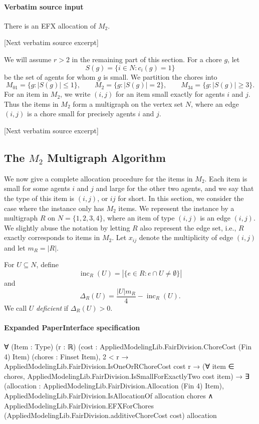 \documentclass[10pt]{article}
\begin{document}
\paragraph{Verbatim source input}
\begin{ReviewVerbatim}
\begin{lemma}\label{lem:M2}
There is an EFX allocation of $M_2$.
\end{lemma}

[Next verbatim source excerpt]

We will assume $r>2$ in the remaining part of this section.
For a chore $g$, let
\[
 S(g)=\{i\in N:c_i(g)=1\}
\]
be the set of agents for whom $g$ is small.  We partition the chores into
\[
M_{01}=\{g:|S(g)|\le 1\},\qquad
M_2=\{g:|S(g)|=2\},\qquad
M_{34}=\{g:|S(g)|\ge 3\}.
\]
For an item in $M_2$, we write $(i,j)$ for an item small exactly for agents
$i$ and $j$.  Thus the items in $M_2$ form a multigraph on the vertex set
$N$, where an edge $(i,j)$ is a chore small for precisely agents $i$ and $j$.

[Next verbatim source excerpt]

\subsection{The $M_2$ Multigraph Algorithm}
\label{subsec:2}
We now give a complete allocation procedure for the items in $M_2$.
Each item is small for some agents $i$ and $j$ and
large for the other two agents, and we say that the type of this item is $(i,j)$, or $ij$ for short.
In this section, we consider the case where the instance only has $M_{2}$ items.
We represent the instance by a
multigraph $R$ on $N=\{1,2,3,4\}$, where an item of type $(i,j)$ is an edge $(i,j)$.
We slightly abuse the notation by letting $R$ also represent the edge set, i.e., $R$ exactly corresponds to items in $M_2$.
Let $x_{ij}$ denote the multiplicity of edge $(i,j)$ and let $m_R=|R|$.

For $U\subseteq N$, define
\[
 \operatorname{inc}_R(U)=\left|\{e\in R:e\cap U\neq\emptyset\}\right|
\]
and
\[
 \Delta_R(U)=\frac{|U|m_R}{4}-\operatorname{inc}_R(U).
\]
We call $U$ \emph{deficient} if $\Delta_R(U)>0$.
\end{ReviewVerbatim}



\paragraph{Expanded PaperInterface specification}
\begin{ReviewVerbatim}
∀ (Item : Type) (r : ℝ) (cost : AppliedModelingLib.FairDivision.ChoreCost (Fin 4) Item) (chores : Finset Item),
  2 < r →
    AppliedModelingLib.FairDivision.IsOneOrRChoreCost cost r →
      (∀ item ∈ chores, AppliedModelingLib.FairDivision.IsSmallForExactlyTwo cost item) →
        ∃ (allocation : AppliedModelingLib.FairDivision.Allocation (Fin 4) Item),
          AppliedModelingLib.FairDivision.IsAllocationOf allocation chores ∧
            AppliedModelingLib.FairDivision.EFXForChores (AppliedModelingLib.FairDivision.additiveChoreCost cost)
              allocation
\end{ReviewVerbatim}
\end{document}

